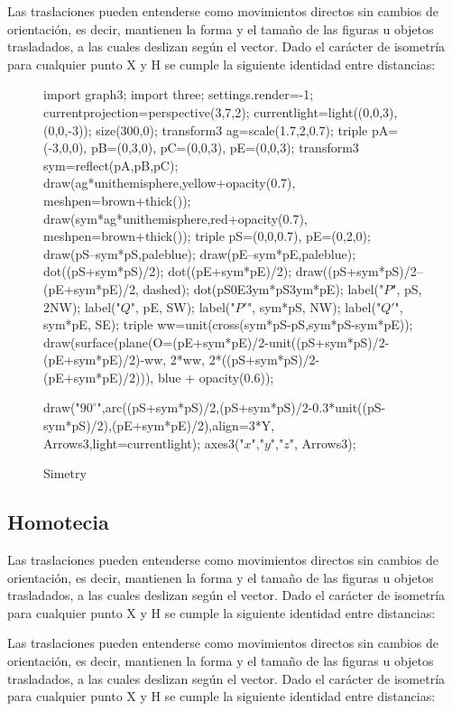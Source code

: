 \documentclass[a4paper]{book}
\begin{document}
Las traslaciones pueden entenderse como movimientos directos sin cambios de orientación, es decir, mantienen la forma y el tamaño de las figuras u objetos trasladados, a las cuales deslizan según el vector. Dado el carácter de isometría para cualquier punto X y H se cumple la siguiente identidad entre distancias:

\begin{figure}[!ht]
	\centering
	\begin{asy}
	import graph3;
	import three;
	settings.render=-1;
	currentprojection=perspective(3,7,2);
	currentlight=light((0,0,3),(0,0,-3));
	size(300,0);
	transform3 ag=scale(1.7,2,0.7);
	triple pA=(-3,0,0), pB=(0,3,0), pC=(0,0,3), pE=(0,0,3);
	transform3 sym=reflect(pA,pB,pC);
	draw(ag*unithemisphere,yellow+opacity(0.7), meshpen=brown+thick());
	draw(sym*ag*unithemisphere,red+opacity(0.7), meshpen=brown+thick());
	triple pS=(0,0,0.7), pE=(0,2,0);
	draw(pS--sym*pS,paleblue);
	draw(pE--sym*pE,paleblue);
	dot((pS+sym*pS)/2);
	dot((pE+sym*pE)/2);
	draw((pS+sym*pS)/2--(pE+sym*pE)/2, dashed);
	dot(pS^^pE^^sym*pS^^sym*pE);
	label("$P$", pS, 2NW);
	label("$Q$", pE, SW);
	label("$P'$", sym*pS, NW);
	label("$Q'$", sym*pE, SE);
	triple ww=unit(cross(sym*pS-pS,sym*pS-sym*pE));
	draw(surface(plane(O=(pE+sym*pE)/2-unit((pS+sym*pS)/2-(pE+sym*pE)/2)-ww, 2*ww, 2*((pS+sym*pS)/2-(pE+sym*pE)/2))), blue + opacity(0.6));

	draw("$90^\circ$",arc((pS+sym*pS)/2,(pS+sym*pS)/2-0.3*unit((pS-sym*pS)/2),(pE+sym*pE)/2),align=3*Y,  Arrows3,light=currentlight);
	axes3("$x$","$y$","$z$", Arrows3);

	\end{asy}
	\caption{Simetry}
\end{figure}
\subsection{Homotecia}
Las traslaciones pueden entenderse como movimientos directos sin cambios de orientación, es decir, mantienen la forma y el tamaño de las figuras u objetos trasladados, a las cuales deslizan según el vector. Dado el carácter de isometría para cualquier punto X y H se cumple la siguiente identidad entre distancias:

Las traslaciones pueden entenderse como movimientos directos sin cambios de orientación, es decir, mantienen la forma y el tamaño de las figuras u objetos trasladados, a las cuales deslizan según el vector. Dado el carácter de isometría para cualquier punto X y H se cumple la siguiente identidad entre distancias:
\end{document}
